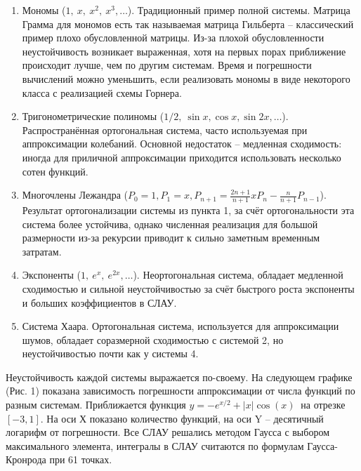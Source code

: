 ﻿\documentclass[a4paper, 12pt]{article}
\begin{document}
\begin{enumerate}
\item  Мономы ($1,\ x,{\ x}^2,{\ x}^3,\dots $). Традиционный пример полной системы. Матрица Грамма для мономов есть так называемая матрица Гильберта -- классический пример плохо обусловленной матрицы. Из-за плохой обусловленности неустойчивость возникает выраженная, хотя на первых порах приближение происходит лучше, чем по другим системам. Время и погрешности вычислений можно уменьшить, если реализовать мономы в виде некоторого класса с реализацией схемы Горнера.

\item  Тригонометрические полиномы ($1/2,\ {\sin x},{\cos x},{\sin\mathrm{2}x},\dots$). Распространённая ортогональная система, часто используемая при аппроксимации колебаний. Основной недостаток -- медленная сходимость: иногда для приличной аппроксимации приходится использовать несколько сотен функций.

\item  Многочлены Лежандра ($P_0=1, P_1=x, P_{n+1}=\frac{2n+1}{n+1}x P_n-\frac{n}{n+1}P_{n-1}$). Результат ортогонализации системы из пункта 1, за счёт ортогональности эта система более устойчива, однако численная реализация для большой размерности из-за рекурсии приводит к сильно заметным временным затратам.

\item  Экспоненты ($1,\ e^x,\ e^{2x},\dots $). Неортогональная система, обладает медленной сходимостью и сильной неустойчивостью за счёт быстрого роста экспоненты и больших коэффициентов в СЛАУ.

\item  Система Хаара. Ортогональная система, используется для аппроксимации шумов, обладает соразмерной сходимостью с системой 2, но неустойчивостью почти как у системы 4.
\end{enumerate}

Неустойчивость каждой системы выражается по-своему. На следующем графике (Рис. 1) показана зависимость погрешности аппроксимации от числа функций по разным системам. Приближается функция $y=-e^{x/2}+\left|x\right|{\cos \left(x\right)\ }$ на отрезке $\left[-3,1\right]$. На оси Х показано количество функций, на оси Y -- десятичный логарифм от погрешности. Все СЛАУ решались методом Гаусса с выбором максимального элемента, интегралы в СЛАУ считаются по формулам Гаусса-Кронрода при 61 точках.
\end{document}
